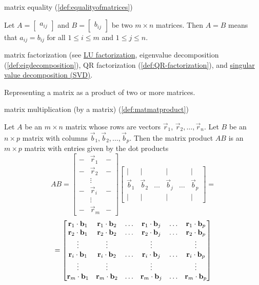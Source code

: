 \documentclass{ximera}
\begin{document}
matrix equality (\ref{def:equalityofmatrices})
\begin{expandable}
    Let $A=\begin{bmatrix} a_{ij}\end{bmatrix}$ and $B=\begin{bmatrix} b_{ij}\end{bmatrix}$ be two $m \times n$ matrices. Then $A=B$ means
that $a_{ij}=b_{ij}$ for all $1\leq i\leq m$ and 
$1\leq j\leq n$.
\end{expandable}

matrix factorization (see \href{https://ximera.osu.edu/oerlinalg/LinearAlgebra/MAT-0070/main}{LU factorization}, eigenvalue decomposition (\ref{def:eigdecomposition}), QR factorization (\ref{def:QR-factorization}), and \href{https://ximera.osu.edu/oerlinalg/LinearAlgebra/RTH-0060/main}{singular value decomposition (SVD)}. 
\begin{expandable}
    Representing a matrix as a product of two or more matrices.
\end{expandable}

matrix multiplication (by a matrix) (\ref{def:matmatproduct})
\begin{expandable}
    Let $A$ be an $m\times n$ matrix whose rows are vectors $\vec{r}_1$, $\vec{r}_2,\ldots ,\vec{r}_n$.  Let $B$ be an $n\times p$ matrix with columns $\vec{b}_1, \vec{b}_2, \ldots, \vec{b}_p$.  Then the matrix product $AB$ is an $m \times p$ matrix with entries given by the dot products
$$AB=\begin{bmatrix}-&\vec{r}_1&-\\-&\vec{r}_2&-\\ &\vdots & \\-&\vec{r}_i &-\\ &\vdots& \\-&\vec{r}_m&-\end{bmatrix}\begin{bmatrix}|&|&&|&&|\\\vec{b}_1& \vec{b}_2 &\ldots  & \vec{b}_j&\ldots& \vec{b}_p\\|&|&&|&&|\end{bmatrix}=$$
$$=\begin{bmatrix}\mathbf{r}_1\cdot \mathbf{b}_1&\mathbf{r}_1\cdot \mathbf{b}_2&\ldots&\mathbf{r}_1\cdot \mathbf{b}_j&\ldots &\mathbf{r}_1\cdot \mathbf{b}_p\\\mathbf{r}_2\cdot \mathbf{b}_1&\mathbf{r}_2\cdot \mathbf{b}_2&\ldots&\mathbf{r}_2\cdot \mathbf{b}_j&\ldots &\mathbf{r}_2\cdot \mathbf{b}_p\\\vdots&\vdots&&\vdots&&\vdots\\\mathbf{r}_i\cdot \mathbf{b}_1&\mathbf{r}_i\cdot \mathbf{b}_2&\ldots&\mathbf{r}_i\cdot \mathbf{b}_j&\ldots &\mathbf{r}_i\cdot \mathbf{b}_p\\\vdots&\vdots&&\vdots&&\vdots\\\mathbf{r}_m\cdot \mathbf{b}_1&\mathbf{r}_m\cdot \mathbf{b}_2&\ldots&\mathbf{r}_m\cdot \mathbf{b}_j&\ldots &\mathbf{r}_m\cdot \mathbf{b}_p\end{bmatrix}
$$
\end{expandable}
\end{document}
